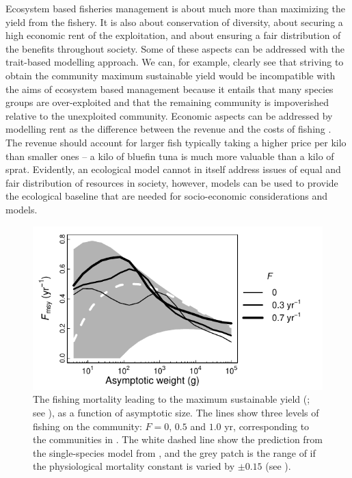 Ecosystem based fisheries management is about much more than maximizing the yield from the fishery.  It is also about conservation of diversity, about securing a high economic rent of the exploitation, and about ensuring a fair distribution of the benefits throughout society.  Some of these aspects can be addressed with the trait-based modelling approach.  We can, for example, clearly see that striving to obtain the community maximum sustainable yield would be incompatible with the aims of ecosystem based management because it entails that many species groups are over-exploited and that the remaining community is impoverished relative to the unexploited community.  Economic aspects can be addressed by modelling rent as the difference between the revenue and the costs of fishing \citep{Gordon1954, Schaefer1954, Clark1973}.  The revenue should account for larger fish typically taking a higher price per kilo than smaller ones \citep{Andersen2015} --  a kilo of bluefin tuna is much more valuable than a kilo of sprat.  Evidently, an ecological model cannot in itself address issues of equal and fair distribution of resources in society, however, models can be used to provide the ecological baseline that are needed for socio-economic considerations and models.  


\begin{figure}[t]
  \centering
  \includegraphics{ChapterCommunityFishing/RefvsF.pdf}
  \caption{The fishing mortality leading to the maximum sustainable yield ({\Fmsy}; see ), as a function of asymptotic size. The lines show three levels of fishing on the community: $F = 0$, $0.5$ and $1.0$ yr\per, corresponding to the communities in . The white dashed line show the prediction from the single-species model from , and the grey patch is the range of {\Fmsy} if the physiological mortality constant is varied by $\pm 0.15$ (see ).}
  \label{fig:RefvsF}
\end{figure}

